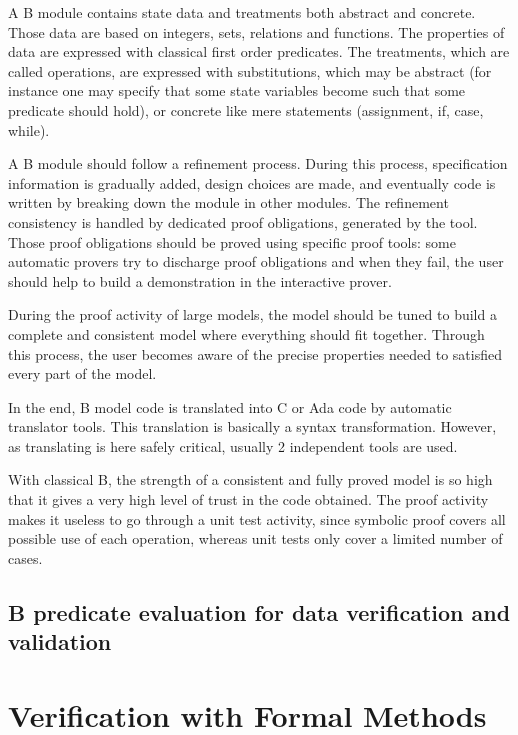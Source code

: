 A B module contains state data and treatments both abstract and
concrete. Those data are based on integers, sets, relations and
functions. The properties of data are expressed with classical first
order predicates. The treatments, which are called operations, are
expressed with substitutions, which may be abstract (for instance one
may specify that some state variables become such that some predicate
should hold), or concrete like mere statements (assignment, if, case,
while).

A B module should follow a refinement process. During this process,
specification information is gradually added, design choices are made,
and eventually code is written by breaking down the module in other
modules. The refinement consistency is handled by dedicated proof
obligations, generated by the tool. Those proof obligations should be
proved using specific proof tools: some automatic provers try to
discharge proof obligations and when they fail, the user should help
to build a demonstration in the interactive prover.

During the proof activity of large models, the model should be tuned
to build a complete and consistent model where everything should fit
together. Through this process, the user becomes aware of the precise
properties needed to satisfied every part of the model.

In the end, B model code is translated into C or Ada code by automatic
translator tools. This translation is basically a syntax
transformation. However, as translating is here safely critical,
usually 2 independent tools are used.

With classical B, the strength of a consistent and fully proved model
is so high that it gives a very high level of trust in the code
obtained. The proof activity makes it useless to go through a unit
test activity, since symbolic proof covers all possible use of each
operation, whereas unit tests only cover a limited number of cases.

\section{B predicate evaluation for data verification and validation}


\begin{comment}
To be completed by Systerel
\end{comment}


\chapter{Verification with Formal Methods}

